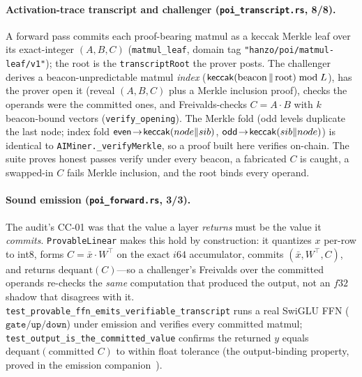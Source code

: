 \paragraph{Activation-trace transcript and challenger (\texttt{poi\_transcript.rs}, 8/8).}
A forward pass commits each proof-bearing matmul as a keccak Merkle leaf over its
exact-integer $(A,B,C)$ (\texttt{matmul\_leaf}, domain tag
\texttt{"hanzo/poi/matmul-leaf/v1"}); the root is the \texttt{transcriptRoot} the prover
posts. The challenger derives a beacon-unpredictable matmul \emph{index}
($\mathsf{keccak}(\text{beacon}\,\|\,\text{root})\bmod L$), has the prover open it (reveal
$(A,B,C)$ plus a Merkle inclusion proof), checks the operands were the committed ones, and
Freivalds-checks $C=A\cdot B$ with $k$ beacon-bound vectors (\texttt{verify\_opening}). The
Merkle fold (odd levels duplicate the last node; index fold $\mathsf{even}\!\to\!
\mathsf{keccak}(node\|sib)$, $\mathsf{odd}\!\to\!\mathsf{keccak}(sib\|node)$) is identical to
\texttt{AIMiner.\_verifyMerkle}, so a proof built here verifies on-chain. The suite
proves honest passes verify under every beacon, a fabricated $C$ is caught, a swapped-in
$C$ fails Merkle inclusion, and the root binds every operand.

\paragraph{Sound emission (\texttt{poi\_forward.rs}, 3/3).} The audit's CC-01 was that the
value a layer \emph{returns} must be the value it \emph{commits}. \texttt{ProvableLinear}
makes this hold by construction: it quantizes $x$ per-row to int8, forms $C=\bar x\cdot
W^\top$ on the exact $i64$ accumulator, commits $(\bar x, W^\top, C)$, and returns
$\mathrm{dequant}(C)$---so a challenger's Freivalds over the committed operands re-checks
the \emph{same} computation that produced the output, not an $f32$ shadow that disagrees
with it. \texttt{test\_provable\_ffn\_emits\_verifiable\_transcript} runs a real SwiGLU FFN
($\texttt{gate}/\texttt{up}/\texttt{down}$) under emission and verifies every committed
matmul; \texttt{test\_output\_is\_the\_committed\_value} confirms the returned $y$ equals
$\mathrm{dequant}(\text{committed } C)$ to within float tolerance (the output-binding
property, proved in the emission companion~\cite{poiemission}).

